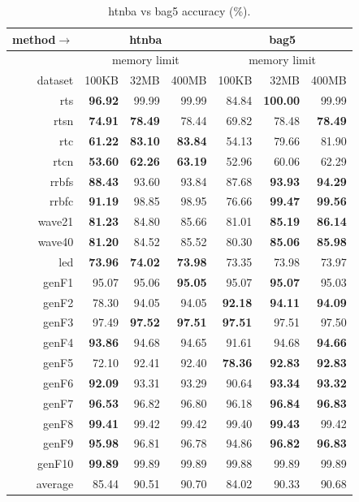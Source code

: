 \begin{table}
\caption{{\sc htnba} vs {\sc bag5} accuracy (\%).}
\label{tab:htnba_vs_bag5_acc}
\centering
\begin{tabular}{|r||r|r|r||r|r|r|}
\hline
method$\rightarrow$ & \multicolumn{3}{|c||}{{\sc htnba}} & \multicolumn{3}{|c|}{{\sc bag5}} \\
\hline
 & \multicolumn{3}{|c||}{memory limit} & \multicolumn{3}{|c|}{memory limit} \\
\hline
dataset & 100KB & 32MB & 400MB & 100KB & 32MB & 400MB \\
\hline
{\sc rts} & \textbf{96.92} & 99.99 & 99.99 & 84.84 & \textbf{100.00} & 99.99 \\
{\sc rtsn} & \textbf{74.91} & \textbf{78.49} & 78.44 & 69.82 & 78.48 & \textbf{78.49} \\
{\sc rtc} & \textbf{61.22} & \textbf{83.10} & \textbf{83.84} & 54.13 & 79.66 & 81.90 \\
{\sc rtcn} & \textbf{53.60} & \textbf{62.26} & \textbf{63.19} & 52.96 & 60.06 & 62.29 \\
{\sc rrbfs} & \textbf{88.43} & 93.60 & 93.84 & 87.68 & \textbf{93.93} & \textbf{94.29} \\
{\sc rrbfc} & \textbf{91.19} & 98.85 & 98.95 & 76.66 & \textbf{99.47} & \textbf{99.56} \\
{\sc wave21} & \textbf{81.23} & 84.80 & 85.66 & 81.01 & \textbf{85.19} & \textbf{86.14} \\
{\sc wave40} & \textbf{81.20} & 84.52 & 85.52 & 80.30 & \textbf{85.06} & \textbf{85.98} \\
{\sc led} & \textbf{73.96} & \textbf{74.02} & \textbf{73.98} & 73.35 & 73.98 & 73.97 \\
{\sc genF1} & 95.07 & 95.06 & \textbf{95.05} & 95.07 & \textbf{95.07} & 95.03 \\
{\sc genF2} & 78.30 & 94.05 & 94.05 & \textbf{92.18} & \textbf{94.11} & \textbf{94.09} \\
{\sc genF3} & 97.49 & \textbf{97.52} & \textbf{97.51} & \textbf{97.51} & 97.51 & 97.50 \\
{\sc genF4} & \textbf{93.86} & 94.68 & 94.65 & 91.61 & 94.68 & \textbf{94.66} \\
{\sc genF5} & 72.10 & 92.41 & 92.40 & \textbf{78.36} & \textbf{92.83} & \textbf{92.83} \\
{\sc genF6} & \textbf{92.09} & 93.31 & 93.29 & 90.64 & \textbf{93.34} & \textbf{93.32} \\
{\sc genF7} & \textbf{96.53} & 96.82 & 96.80 & 96.18 & \textbf{96.84} & \textbf{96.83} \\
{\sc genF8} & \textbf{99.41} & 99.42 & 99.42 & 99.40 & \textbf{99.43} & 99.42 \\
{\sc genF9} & \textbf{95.98} & 96.81 & 96.78 & 94.86 & \textbf{96.82} & \textbf{96.83} \\
{\sc genF10} & \textbf{99.89} & 99.89 & 99.89 & 99.88 & 99.89 & 99.89 \\
\hline
average & 85.44 & 90.51 & 90.70 & 84.02 & 90.33 & 90.68 \\
\hline
\end{tabular}
\end{table}

